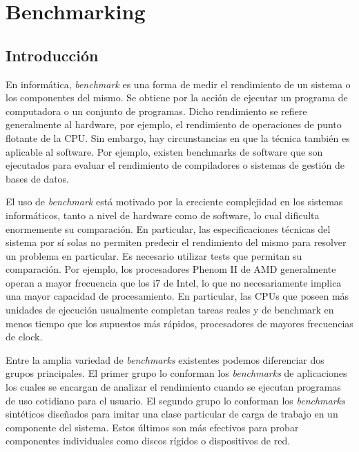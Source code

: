 \chapter{Benchmarking}

\section{Introducción}

En informática, \textit{benchmark} es una forma de medir el rendimiento de un sistema o los componentes del mismo. Se obtiene por la acción de ejecutar un
programa de computadora o un conjunto de programas. Dicho rendimiento se refiere generalmente al
hardware, por ejemplo, el rendimiento de operaciones de punto flotante
de la CPU. Sin embargo, hay circunstancias en que la técnica también
es aplicable al software. Por ejemplo, existen benchmarks de software
que son ejecutados para evaluar el rendimiento de compiladores o
sistemas de gestión de bases de datos.

El uso de \textit{benchmark} está motivado por la creciente
complejidad en los sistemas informáticos, tanto a nivel de hardware
como de software, lo cual dificulta enormemente su comparación. En
particular, las especificaciones técnicas del sistema por sí solas no
permiten predecir el rendimiento del mismo para resolver un problema
en particular. Es necesario utilizar tests que permitan su
comparación. Por ejemplo, los procesadores Phenom II de AMD
generalmente operan a mayor frecuencia que los i7 de Intel, lo
que no necesariamente implica una mayor capacidad de procesamiento. En
particular, las CPUs que poseen más unidades de ejecución usualmente
completan tareas reales y de benchmark en menos tiempo que los
supuestos más rápidos, procesadores de mayores frecuencias de clock.

Entre la amplia variedad de \textit{benchmarks} existentes podemos
diferenciar dos grupos principales. El primer grupo lo conforman los
\textit{benchmarks} de aplicaciones los cuales se encargan de analizar
el rendimiento cuando se ejecutan programas de uso cotidiano para el
usuario. El segundo grupo lo conforman los \textit{benchmarks}
sintéticos diseñados para imitar una clase particular
de carga de trabajo en un componente del sistema. Estos últimos son
más efectivos para probar componentes individuales como discos rígidos
o dispositivos de red.
	
